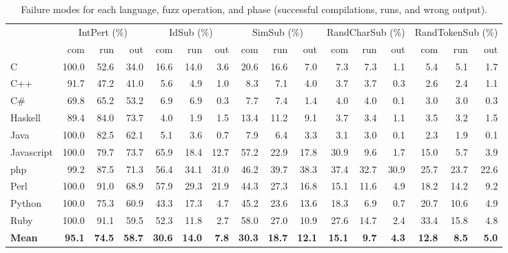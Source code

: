 \documentclass[10pt]{sigplanconf}
\begin{document}
\begin{table}
\begin{center}
\begin{tabular}{ l r r r|r r r|r r r|r r r|r r r}
& \multicolumn{3}{c}{IntPert (\%)} & \multicolumn{3}{c}{IdSub (\%)} & \multicolumn{3}{c}{SimSub (\%)} & \multicolumn{3}{c}{RandCharSub (\%)} & \multicolumn{3}{c}{RandTokenSub (\%)}\\ 
	       & com  & run  & out  & com  & run  & out  & com  & run  & out  & com & run   & out  & com  & run  & out\\
\hline													
C & 100.0 & 52.6 & 34.0 & 16.6 & 14.0 & 3.6  & 20.6 & 16.6 & 7.0  & 7.3 & 7.3 & 1.1  & 5.4 & 5.1 & 1.7 \\
C++ & 91.7 & 47.2 & 41.0  & 5.6 & 4.9 & 1.0  & 8.3 & 7.1 & 4.0  & 3.7 & 3.7 & 0.3  & 2.6 & 2.4 & 1.1 \\
C\# & 69.8 & 65.2 & 53.2  & 6.9 & 6.9 & 0.3  & 7.7 & 7.4 & 1.4  & 4.0 & 4.0 & 0.1  & 3.0 & 3.0 & 0.3 \\
Haskell & 89.4 & 84.0 & 73.7  & 4.0 & 1.9 & 1.5  & 13.4 & 11.2 & 9.1  & 3.7 & 3.4 & 1.1  & 3.5 & 3.2 & 1.5 \\
Java & 100.0 & 82.5 & 62.1  & 5.1 & 3.6 & 0.7  & 7.9 & 6.4 & 3.3  & 3.1 & 3.0 & 0.1  & 2.3 & 1.9 & 0.1 \\
Javascript & 100.0 & 79.7 & 73.7  & 65.9 & 18.4 & 12.7  & 57.2 & 22.9 & 17.8  & 30.9 & 9.6 & 1.7  & 15.0 & 5.7 & 3.9 \\
{\sc php} & 99.2 & 87.5 & 71.3  & 56.4 & 34.1 & 31.0  & 46.2 & 39.7 & 38.3  & 37.4 & 32.7 & 30.9  & 25.7 & 23.7 & 22.6 \\
Perl & 100.0 & 91.0 & 68.9  & 57.9 & 29.3 & 21.9  & 44.3 & 27.3 & 16.8  & 15.1 & 11.6 & 4.9  & 18.2 & 14.2 & 9.2 \\
Python & 100.0 & 75.3 & 60.9  & 43.3 & 17.3 & 4.7  & 45.2 & 23.6 & 13.6  & 18.3 & 6.9 & 0.7  & 20.7 & 10.6 & 4.9 \\
Ruby & 100.0 & 91.1 & 59.5  & 52.3 & 11.8 & 2.7  & 58.0 & 27.0 & 10.9  & 27.6 & 14.7 & 2.4  & 33.4 & 15.8 & 4.8 \\
\textbf{Mean} & \textbf{95.1} & \textbf{74.5} & \textbf{58.7}  & \textbf{30.6} & \textbf{14.0} & \textbf{7.8}  & \textbf{30.3} & \textbf{18.7} & \textbf{12.1}  & \textbf{15.1} & \textbf{9.7} & \textbf{4.3}  & \textbf{12.8} & \textbf{8.5} & \textbf{5.0} \\
\end{tabular}
\end{center}
\caption{Failure modes for each language, fuzz operation, and phase (successful compilations, runs, and wrong output).}
\label{tbl:aggregated-per-language}
\end{table}
\end{document}
